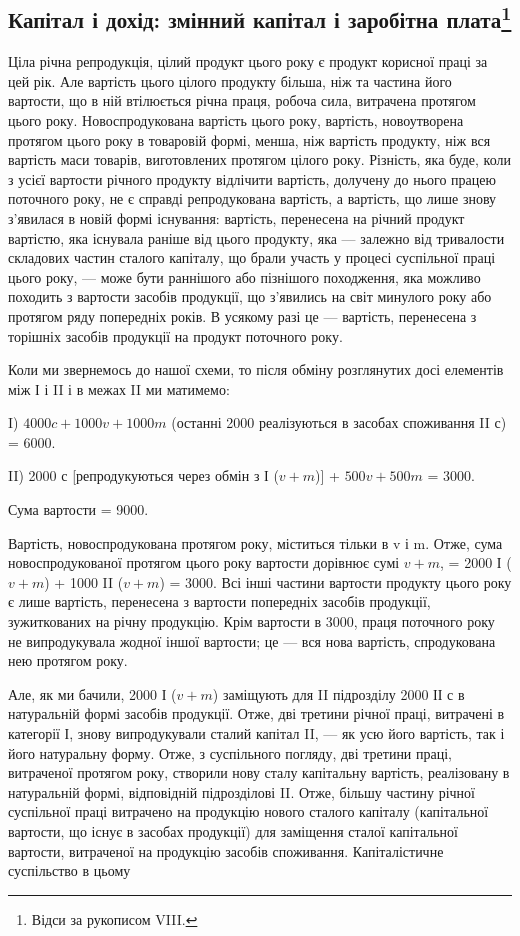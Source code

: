 \subsection{Капітал і дохід: змінний капітал і заробітна плата\footnote{
Відси за рукописом VIII.
}}

Ціла річна репродукція, цілий продукт цього року є продукт корисної
праці за цей рік. Але вартість цього цілого продукту більша, ніж
та частина його вартости, що в ній втілюється річна праця, робоча
сила, витрачена протягом цього року. Новоспродукована вартість
цього року, вартість, новоутворена протягом цього року в товаровій
формі, менша, ніж вартість продукту, ніж вся вартість маси товарів,
виготовлених протягом цілого року. Різність, яка буде, коли з усієї
вартости річного продукту відлічити вартість, долучену до нього працею
поточного року, не є справді репродукована вартість, а вартість, що лише
знову з’явилася в новій формі існування: вартість, перенесена на річний
продукт вартістю, яка існувала раніше від цього продукту, яка — залежно
від тривалости складових частин сталого капіталу, що брали участь у
процесі суспільної праці цього року, — може бути раннішого або пізнішого
походження, яка можливо походить з вартости засобів продукції,
що з’явились на світ минулого року або протягом ряду попередніх років.
В усякому разі це — вартість, перенесена з торішніх засобів продукції
на продукт поточного року.

Коли ми звернемось до нашої схеми, то після обміну розглянутих досі
елементів між І і II і в межах II ми матимемо:

I) $4000 c + 1000 v + 1000 m$ (останні 2000 реалізуються в засобах
споживання II с) = 6000.

II) 2000 с [репродукуються через обмін з І ($v + m$)] + $500 v + 500 m$ =
3000.

Сума вартости = 9000.

Вартість, новоспродукована протягом року, міститься тільки в v і m.
Отже, сума новоспродукованої протягом цього року вартости дорівнює
сумі $v + m$, = 2000 І ($v + m$) + 1000 II ($v + m$) = 3000. Всі інші частини
вартости продукту цього року є лише вартість, перенесена з вартости
попередніх засобів продукції, зужиткованих на річну продукцію.
Крім вартости в 3000, праця поточного року не випродукувала жодної
іншої вартости; це — вся нова вартість, спродукована нею протягом року.

Але, як ми бачили, 2000 І ($v + m$) заміщують для II підрозділу 2000
ІІ с в натуральній формі засобів продукції. Отже, дві третини річної
праці, витрачені в категорії І, знову випродукували сталий капітал II, —
як усю його вартість, так і його натуральну форму. Отже, з суспільного
погляду, дві третини праці, витраченої протягом року, створили нову сталу
капітальну вартість, реалізовану в натуральній формі, відповідній підрозділові
II. Отже, більшу частину річної суспільної праці витрачено на
продукцію нового сталого капіталу (капітальної вартости, що існує в
засобах продукції) для заміщення сталої капітальної вартости, витраченої
на продукцію засобів споживання. Капіталістичне суспільство в цьому
\parbreak{}  %
